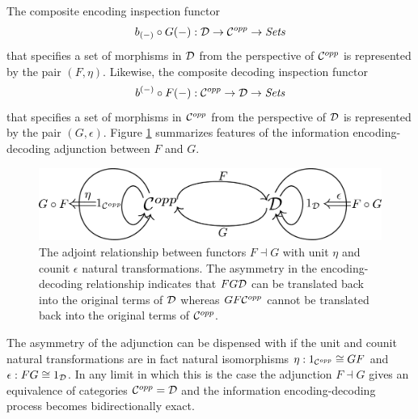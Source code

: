 \documentclass[aps,twocolumn]{revtex4-1}
\begin{document}
The composite encoding inspection functor 
$$
b_{(-)} \circ G(-): {\mathcal D} \rightarrow {\mathcal C}^{opp} \rightarrow \textit{Sets}
$$
that specifies a set of morphisms in ${\mathcal D}$ from the perspective of ${\mathcal C}^{opp}$ is represented by the pair $(F,\eta)$. Likewise, the composite decoding inspection functor 
$$
b^{(-)} \circ F(-): {\mathcal C}^{opp} \rightarrow {\mathcal D} \rightarrow \textit{Sets}
$$
that specifies a set of morphisms in ${\mathcal C}^{opp}$ from the perspective of ${\mathcal D}$ is represented by the pair $(G,\epsilon)$. Figure \ref{fig:adjunction} summarizes features of the information encoding-decoding adjunction between $F$ and $G$.

\begin{figure}
\noindent\includegraphics[width=0.9\columnwidth]{fig/adjunction.pdf}
\caption{The adjoint relationship between functors $F \dashv G$ with unit $\eta$ and counit $\epsilon$ natural transformations. The asymmetry in the encoding-decoding relationship indicates that $FG {\mathcal D}$ can be translated back into the original terms of ${\mathcal D}$ whereas $GF {\mathcal C}^{opp}$ cannot be translated back into the original terms of ${\mathcal C}^{opp}$.}
\label{fig:adjunction}
\end{figure}

The asymmetry of the adjunction can be dispensed with if the unit and counit natural transformations are in fact natural isomorphisms $\eta: 1_{{\mathcal C}^{opp}} \cong GF$ and $\epsilon: FG \cong 1_{{\mathcal D}}$. In any limit in which this is the case the adjunction $F \dashv G$ gives an equivalence of categories ${\mathcal C}^{opp} = {\mathcal D}$ and the information encoding-decoding process becomes bidirectionally exact.
\end{document}

